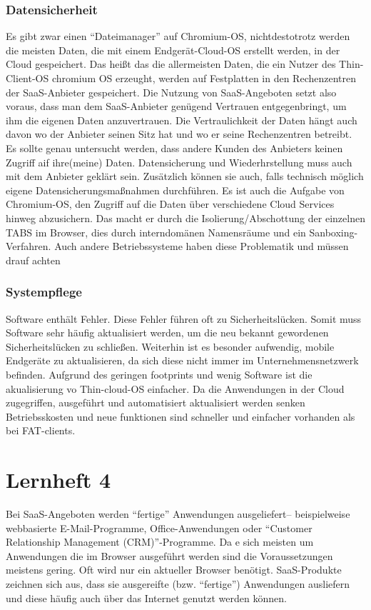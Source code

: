 \documentclass[a4paper,10pt]{article}
\begin{document}
\section{Datensicherheit}
Es gibt zwar einen ``Dateimanager'' auf Chromium-OS, nichtdestotrotz werden die meisten Daten, die mit einem Endgerät-Cloud-OS erstellt werden, in der Cloud gespeichert. Das heißt das die allermeisten Daten, die ein Nutzer des Thin-Client-OS chromium OS erzeught, werden auf Festplatten in den Rechenzentren der SaaS-Anbieter gespeichert. Die Nutzung von SaaS-Angeboten setzt also voraus, dass man dem SaaS-Anbieter genügend Vertrauen entgegenbringt, um ihm die eigenen Daten anzuvertrauen. Die Vertraulichkeit der Daten hängt auch davon wo der Anbieter seinen Sitz hat und wo er seine Rechenzentren betreibt. Es sollte genau untersucht werden, dass andere Kunden des Anbieters keinen Zugriff aif ihre(meine) Daten. Datensicherung und Wiederhrstellung muss auch mit dem Anbieter geklärt sein. Zusätzlich können sie auch, falls technisch möglich eigene Datensicherungsmaßnahmen durchführen.
\vspace{3mm}
Es ist auch die Aufgabe von Chromium-OS, den Zugriff auf die Daten über verschiedene Cloud Services hinweg abzusichern. Das macht er durch die Isolierung/Abschottung der einzelnen TABS im Browser, dies durch interndomänen Namensräume und ein Sanboxing-Verfahren. Auch andere Betriebssysteme haben diese Problematik und müssen drauf achten

\section{Systempflege}
Software enthält Fehler. Diese Fehler führen oft zu Sicherheitslücken. Somit muss Software sehr häufig aktualisiert werden, um die neu bekannt gewordenen Sicherheitslücken zu schließen. Weiterhin ist es besonder aufwendig, mobile Endgeräte zu aktualisieren, da sich diese nicht immer im Unternehmensnetzwerk befinden. Aufgrund des geringen footprints und wenig Software ist die akualisierung vo Thin-cloud-OS einfacher. Da die Anwendungen in der Cloud zugegriffen, ausgeführt und automatisiert aktualisiert werden senken Betriebsskosten und neue funktionen sind schneller und einfacher vorhanden als bei FAT-clients.
\part{Lernheft 4}
Bei SaaS-Angeboten werden ``fertige'' Anwendungen ausgeliefert-- beispielweise webbasierte E-Mail-Programme, Office-Anwendungen oder ``Customer Relationship Management (CRM)''-Programme. Da e sich meisten um Anwendungen die im Browser ausgeführt werden sind die Voraussetzungen meistens gering. Oft wird nur ein aktueller Browser benötigt. SaaS-Produkte zeichnen sich aus, dass sie ausgereifte (bzw. ``fertige'') Anwendungen ausliefern und diese häufig auch über das Internet genutzt werden können.
\end{document}
